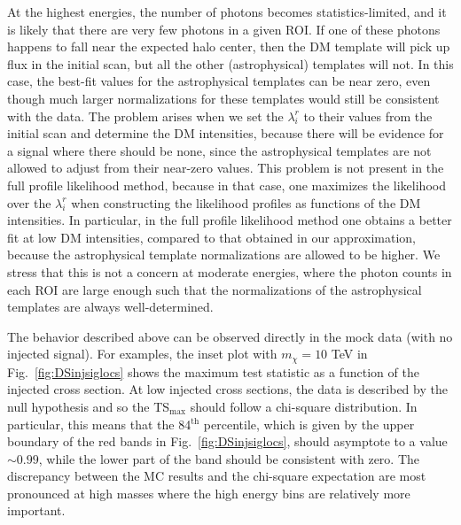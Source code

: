 At the highest energies, the number of photons becomes statistics-limited, and it is likely that there are very few photons in a given ROI. If one of these photons happens to fall  near the expected halo center, then the DM template will pick up flux in the initial scan, but all the other (astrophysical) templates will not.  In this case, the best-fit values for the astrophysical templates can be near zero, even though much larger normalizations for these templates would still be consistent with the data.  The problem arises when we set the $\lambda_i^r$ to their values from the initial scan and determine the DM intensities, because there will be evidence for a signal where there should be none, since the astrophysical templates are not allowed to adjust from their near-zero values.  This problem is not present in the full profile likelihood method, because in that case, one maximizes the likelihood over the $\lambda_i^r$ when constructing the likelihood profiles as functions of the DM intensities.  In particular, in the full profile likelihood method one obtains a better fit at low DM intensities, compared to that obtained in our approximation, because the astrophysical template normalizations are allowed to be higher.  We stress that this is not a concern at moderate energies, where the photon counts in each ROI are large enough such that the normalizations of the astrophysical templates are always well-determined. 

The behavior described above can be observed directly  in the mock data (with no injected signal).  For examples, the inset plot with $m_\chi = 10$ TeV  in Fig.~\ref{fig:DSinjsiglocs} shows the maximum test statistic as a function of the injected cross section.  At low injected cross sections, the data is described by the null hypothesis and so the TS$_\text{max}$ should follow a chi-square distribution.  In particular, this means that the 84$^\text{th}$ percentile, which is given by the upper  boundary of the red bands in Fig.~\ref{fig:DSinjsiglocs}, should asymptote to a value $\sim$$0.99$, while the lower part of the band should be consistent with zero.  
The discrepancy between the MC results and the chi-square expectation are most pronounced at high masses where the high energy bins are relatively more important.  

